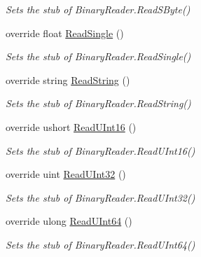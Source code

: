 \begin{DoxyCompactItemize}
\begin{DoxyCompactList}\small\item\em Sets the stub of Binary\-Reader.\-Read\-S\-Byte()\end{DoxyCompactList}\item 
override float \hyperlink{class_system_1_1_i_o_1_1_fakes_1_1_stub_binary_reader_afcec35c2eebe39a5258f06208d6ae624}{Read\-Single} ()
\begin{DoxyCompactList}\small\item\em Sets the stub of Binary\-Reader.\-Read\-Single()\end{DoxyCompactList}\item 
override string \hyperlink{class_system_1_1_i_o_1_1_fakes_1_1_stub_binary_reader_aecd35672efe1b0a632e7aa9c2d5260d7}{Read\-String} ()
\begin{DoxyCompactList}\small\item\em Sets the stub of Binary\-Reader.\-Read\-String()\end{DoxyCompactList}\item 
override ushort \hyperlink{class_system_1_1_i_o_1_1_fakes_1_1_stub_binary_reader_a93670591ab0349c309fa444ef60a39d4}{Read\-U\-Int16} ()
\begin{DoxyCompactList}\small\item\em Sets the stub of Binary\-Reader.\-Read\-U\-Int16()\end{DoxyCompactList}\item 
override uint \hyperlink{class_system_1_1_i_o_1_1_fakes_1_1_stub_binary_reader_a3f9fc8e8dfaed9c07579c951d5e07dd4}{Read\-U\-Int32} ()
\begin{DoxyCompactList}\small\item\em Sets the stub of Binary\-Reader.\-Read\-U\-Int32()\end{DoxyCompactList}\item 
override ulong \hyperlink{class_system_1_1_i_o_1_1_fakes_1_1_stub_binary_reader_a1fafb8a20feebf1ed4e33f45d9aad6e9}{Read\-U\-Int64} ()
\begin{DoxyCompactList}\small\item\em Sets the stub of Binary\-Reader.\-Read\-U\-Int64()\end{DoxyCompactList}\end{DoxyCompactItemize}
